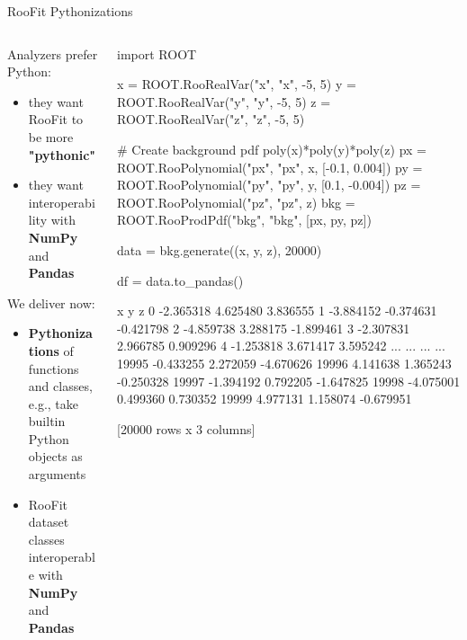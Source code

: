 \documentclass[aspectratio=169]{beamer}
\begin{document}
\begin{frame}[fragile]{RooFit Pythonizations}
\begin{columns}
    \begin{column}{0.5\textwidth}
Analyzers prefer Python:
    \begin{itemize}
        \item they want RooFit to be more \textbf{"pythonic"}
        \item they want interoperability with \textbf{NumPy} and \textbf{Pandas}
    \end{itemize}
\vspace{0.5cm}
We deliver now:

    \begin{itemize}
        \item \textbf{Pythonizations} of functions and classes, e.g., take builtin Python objects as arguments
    \item RooFit dataset classes interoperable with \textbf{NumPy} and \textbf{Pandas}
    \end{itemize}
\end{column}
    \begin{column}{0.5\textwidth}
    \vspace{-0.5cm}
    \begin{pycelltiny}
import ROOT

x = ROOT.RooRealVar("x", "x", -5, 5)
y = ROOT.RooRealVar("y", "y", -5, 5)
z = ROOT.RooRealVar("z", "z", -5, 5)

# Create background pdf poly(x)*poly(y)*poly(z)
px = ROOT.RooPolynomial("px", "px", x, [-0.1, 0.004])
py = ROOT.RooPolynomial("py", "py", y, [0.1, -0.004])
pz = ROOT.RooPolynomial("pz", "pz", z)
bkg = ROOT.RooProdPdf("bkg", "bkg", [px, py, pz])

data = bkg.generate((x, y, z), 20000)

df = data.to_pandas()
    \end{pycelltiny}
    \begin{myterminaltiny}
              x         y         z
0     -2.365318  4.625480  3.836555
1     -3.884152 -0.374631 -0.421798
2     -4.859738  3.288175 -1.899461
3     -2.307831  2.966785  0.909296
4     -1.253818  3.671417  3.595242
...         ...       ...       ...
19995 -0.433255  2.272059 -4.670626
19996  4.141638  1.365243 -0.250328
19997 -1.394192  0.792205 -1.647825
19998 -4.075001  0.499360  0.730352
19999  4.977131  1.158074 -0.679951

[20000 rows x 3 columns]
    \end{myterminaltiny}
\end{column}
\end{columns}
\end{frame}
\end{document}
